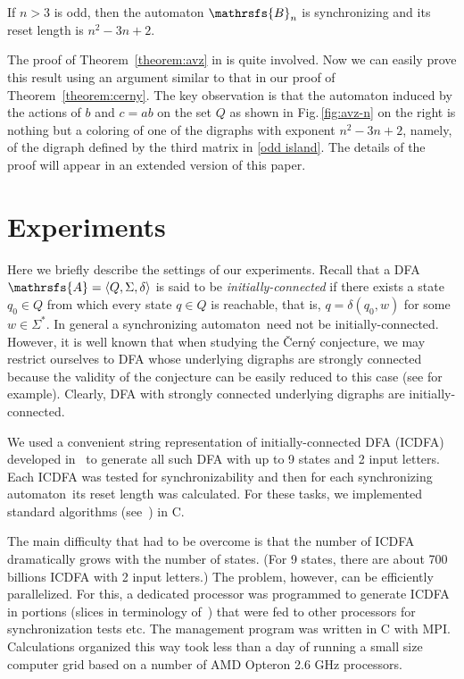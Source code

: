 \documentclass[11pt]{llncs}
\newcommand{\san}{synchronizing automaton}
\begin{document}
\begin{theorem}
\label{theorem:avz}
If $n>3$ is odd, then the automaton $\mathrsfs{B}_n$ is synchronizing and
its reset length is $n^2-3n+2$.
\end{theorem}

The proof of Theorem~\ref{theorem:avz} in \cite{AVZ} is quite involved. Now we can easily
prove this result using an argument similar to that in our proof of Theorem~\ref{theorem:cerny}.
The key observation is that the automaton induced by the actions of $b$ and $c=ab$ on the set $Q$
as shown in Fig.\,\ref{fig:avz-n} on the right is nothing but a coloring of one of the digraphs
with exponent $n^2-3n+2$, namely, of the digraph defined by the third matrix in \eqref{odd island}.
The details of the proof will appear in an extended version of this paper.

\section{Experiments}
\label{experiments}

Here we briefly describe the settings of our experiments. Recall that a DFA
$\mathrsfs{A}=\langle Q,\Sigma,\delta\rangle$ is said to be \emph{initially-connected}
if there exists a state $q_0\in Q$ from which every state $q\in Q$ is reachable,
that is, $q=\delta(q_0,w)$ for some $w\in\Sigma^*$. In general a \san\ need not
be initially-connected. However, it is well known that when studying the \v{C}ern\'{y}
conjecture, we may restrict ourselves to DFA whose underlying digraphs are strongly
connected because the validity of the conjecture can be easily reduced to this case
(see \cite{Pi78} for example). Clearly, DFA with strongly connected underlying digraphs
are initially-connected.

We used a convenient string representation of initially-connected DFA (ICDFA)
developed in~\cite{AMR} to generate all such DFA with up to 9 states and 2 input
letters. Each ICDFA was tested for synchronizability and then for each \san\
its reset length was calculated. For these tasks, we implemented standard
algorithms (see~\cite{Sa05,Vo08}) in C.

The main difficulty that had to be overcome is that the number of ICDFA dramatically
grows with the number of states. (For 9 states, there are about 700 billions
ICDFA with 2 input letters.) The problem, however, can be efficiently parallelized.
For this, a dedicated processor was programmed to generate ICDFA in portions (slices
in terminology of~\cite{AMR}) that were fed to other processors for synchronization
tests etc. The management program was written in C with MPI. Calculations organized
this way took less than a day of running a small size computer grid based on a number
of AMD Opteron 2.6 GHz processors.
\end{document}
